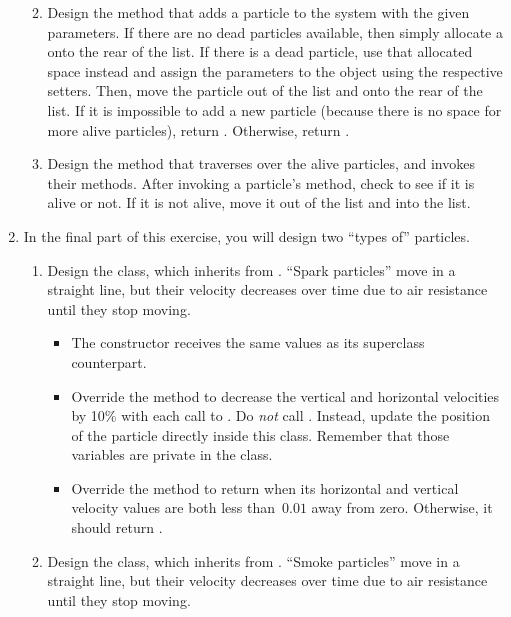 \begin{enumerate}[label=(\alph*)]
\begin{enumerate}[label=(\roman*)]
\begin{itemize}
    \end{itemize}
    \item Design the  method that adds a particle to the system with the given parameters. If there are no dead particles available, then simply allocate a  onto the rear of the  list. If there is a dead particle, use that allocated space instead and assign the parameters to the object using the respective setters. Then, move the particle out of the  list and onto the rear of the  list. If it is impossible to add a new particle (because there is no space for more alive particles), return . Otherwise, return .
    \item Design the  method that traverses over the alive particles, and invokes their  methods. After invoking a particle's  method, check to see if it is alive or not. If it is not alive, move it out of the  list and into the  list. 
  \end{enumerate}
  \item In the final part of this exercise, you will design two ``types of'' particles.
  \begin{enumerate}[label=(\roman*)]
    \item Design the  class, which inherits from . ``Spark particles'' move in a straight line, but their velocity decreases over time due to air resistance until they stop moving.
    \begin{itemize}
        \item The  constructor receives the same values as its superclass counterpart.
        \item Override the  method to decrease the vertical and horizontal velocities by 10\% with each call to . Do \emph{not} call . Instead, update the position of the particle directly inside this class. Remember that those variables are private in the  class.
        \item Override the  method to return  when its horizontal and vertical velocity values are both less than~$0.01$ away from zero. Otherwise, it should return .
    \end{itemize}
    \item Design the  class, which inherits from . ``Smoke particles'' move in a straight line, but their velocity decreases over time due to air resistance until they stop moving.

\end{enumerate}
\end{enumerate}

